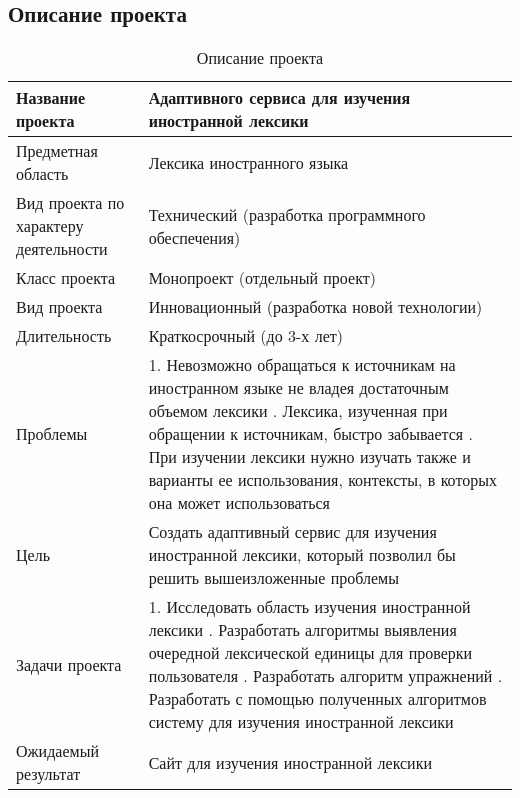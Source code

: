 \documentclass[a4paper,14pt]{extarticle}
\begin{document}
\subsection{Описание проекта}
\begin{table}[H]
    \caption{Описание проекта}
    \begin{tabular}{ | p{5.5cm} | p{11cm} | }
        \hline
        Название проекта & Адаптивного сервиса для изучения иностранной лексики \\ \hline
        Предметная область & Лексика иностранного языка \\ \hline
        Вид проекта по характеру деятельности & Технический (разработка программного обеспечения) \\ \hline
        Класс проекта & Монопроект (отдельный проект) \\ \hline
        Вид проекта & Инновационный (разработка новой технологии) \\ \hline
        Длительность & Краткосрочный (до 3-х лет) \\ \hline
        Проблемы & 1. Невозможно обращаться к источникам на иностранном языке не владея достаточным объемом лексики \linebreak
                   2. Лексика, изученная при обращении к источникам, быстро забывается \linebreak
                   3. При изучении лексики нужно изучать также и варианты ее
                   использования, контексты, в которых она может использоваться \\ \hline
        Цель & Создать адаптивный сервис для изучения иностранной лексики, который позволил бы решить вышеизложенные проблемы \\ \hline
        Задачи проекта & 1. Исследовать область изучения иностранной лексики \linebreak
                         2. Разработать алгоритмы выявления очередной лексической единицы для проверки пользователя \linebreak
                         3. Разработать алгоритм упражнений \linebreak
                         4. Разработать с помощью полученных алгоритмов систему для изучения иностранной лексики \\ \hline
        Ожидаемый результат & Сайт для изучения иностранной лексики \\ \hline
    \end{tabular}
\end{table}
\end{document}

